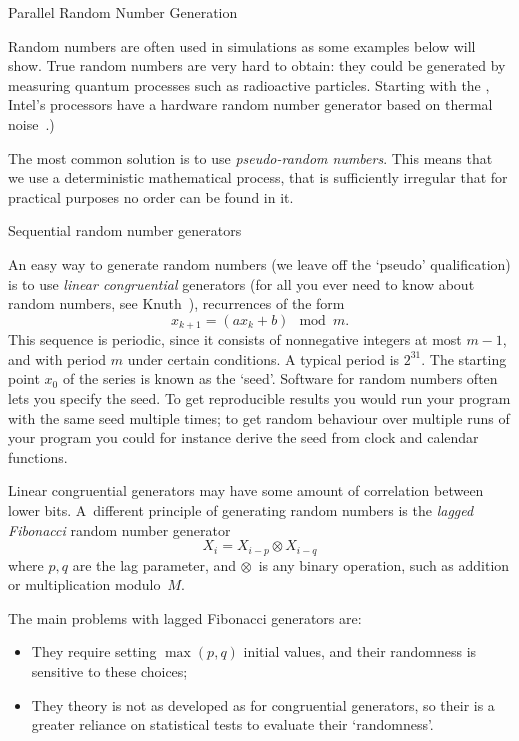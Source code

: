 \lstset{language=C}

 {Parallel Random Number Generation}
\label{sec:parallel-random}

Random numbers are often used in simulations as some examples below
will show. True random numbers are very hard to obtain: they could be
generated by measuring quantum processes such as radioactive
particles. Starting with the ,
Intel's processors have a hardware random number generator based on
thermal noise~\cite{Cryptography:IvyRandom2012}.)

The most common solution is to use
\emph{pseudo-random numbers}. This means that we use a deterministic mathematical
process, that is sufficiently irregular that for practical purposes no
order can be found in it.

 {Sequential random number generators}

An easy way to generate random numbers (we leave off the `pseudo'
qualification) is to use
\emph{linear congruential}
 generators (for all you
ever need to know about random numbers, see Knuth~\cite{Knuth:vol2}),
recurrences of the form
\[ x_{k+1} = (ax_k+b) \mod m. \]
This sequence is periodic, since it consists of nonnegative integers at most
$m-1$, and with period $m$ under certain conditions. A
typical period is $2^{31}$. The starting point $x_0$ of the series is
known as the `seed'. Software for random numbers often lets you
specify the seed. To get reproducible results you would run your
program with the same seed multiple times; to get random behaviour
over multiple runs of your program you could for instance derive the
seed from clock and calendar functions.

Linear congruential generators may have some amount of correlation
between lower bits. A~different principle of generating random numbers
is the
\emph{lagged Fibonacci}
random number generator
\[ X_i = X_{i-p}\otimes X_{i-q} \]
where $p,q$ are the lag parameter, and $\otimes$~is any binary operation,
such as addition or multiplication modulo~$M$.

The main problems with lagged Fibonacci generators are:
\begin{itemize}
\item They require setting $\max(p,q)$ initial values, and their
  randomness is sensitive to these choices;
\item They theory is not as developed as for congruential generators,
  so their is a greater reliance on statistical tests to evaluate
  their `randomness'.
\end{itemize}


